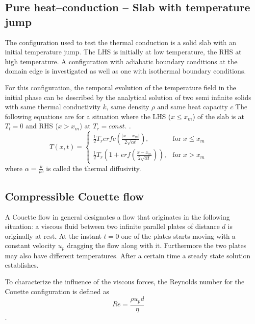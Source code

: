\documentclass[11pt,a4paper,twoside]{report}
\begin{document}
\subsection{Pure heat--conduction -- Slab with temperature jump}
\label{sec:genIntro_PureHeat}
The configuration used to test the thermal conduction is a solid slab with an initial temperature jump. The LHS is initially at low temperature, the RHS at high temperature. A configuration with adiabatic boundary conditions at the domain edge is investigated as well as one with isothermal boundary conditions.

For this configuration, the temporal evolution of the temperature field in the initial phase can be described by the analytical solution of two semi infinite solids with same thermal conductivity $k$, same density $\rho$ and same heat capacity $c$ %
The following equations are for a situation where the LHS ($x \leq x_m$) of the slab is at $T_l=0$ and RHS ($x > x_m$) at $T_r=const.$ \cite{Carslaw1959}.
\begin{equation}
\label{eq:Two_SemiInfBodies}
 T(x,t)=\begin{cases}
\frac{1}{2} T_r erfc\left(\frac{|x-x_m|}{2\sqrt{\alpha t}}\right),& \text{for  $x\leq x_m$} \\
\frac{1}{2} T_r\left(1+erf\left(\frac{x-x_m}{2\sqrt{\alpha t}}\right)\right),& \text{for  $x> x_m$}
\end{cases}
\end{equation}
where $\alpha=\frac{k}{\rho c}$ is called the thermal diffusivity. 



\subsection{Compressible Couette flow}
\label{sec:comprCouette_genIntro}
A Couette flow in general designates a flow that originates in the following situation: a viscous fluid between two infinite parallel plates of distance $d$ is originally at rest. At the instant $t=0$ one of the plates starts moving with a constant velocity $u_p$ dragging the flow along with it. Furthermore the two plates may also have different temperatures. After a certain time a steady state solution establishes. 

To characterize the influence of the viscous forces, the Reynolds number for the Couette configuration is defined as
\begin{equation}
\label{eq:Re_comprCouette}
 Re=\frac{\rho u_p d}{\eta}
\end{equation}.
\end{document}
